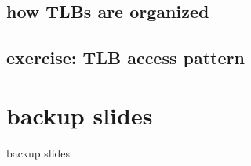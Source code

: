 \subsection{how TLBs are organized}

\subsection{exercise: TLB access pattern}


\section{backup slides}
\begin{frame}{backup slides}
\end{frame}



